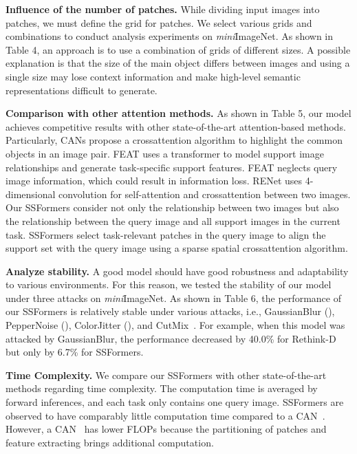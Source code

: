 \documentclass{SCIS2019}
\begin{document}
\textbf{Influence of the number of patches.}
While dividing input images into patches, we must define the grid for patches. We select various grids and combinations to conduct analysis experiments on \emph{mini}ImageNet. As shown in Table 4, an approach is to use a combination of grids of different sizes. A possible explanation is that the size of the main object differs between images and using a single size may lose context information and make high-level semantic representations difficult to generate. 

\textbf{Comparison with other attention methods.}
As shown in Table 5, our model achieves competitive results with other state-of-the-art attention-based methods. Particularly, CANs propose a crossattention algorithm to highlight the common objects in an image pair. FEAT uses a transformer to model support image relationships and generate task-specific support features. FEAT neglects query image information, which could result in information loss. RENet uses 4-dimensional convolution for self-attention and crossattention between two images. Our SSFormers consider not only the relationship between two images but also the relationship between the query image and all support images in the current task. SSFormers select task-relevant patches in the query image to align the support set with the query image using a sparse spatial crossattention algorithm.

\textbf{Analyze stability.}
A good model should have good robustness and adaptability to various environments. For this reason, we tested the stability of our model under three attacks on \emph{mini}ImageNet. As shown in Table 6, the performance of our SSFormers is relatively stable under various attacks, i.e., GaussianBlur (), PepperNoise (), ColorJitter (), and CutMix~\cite{45}. For example, when this model was attacked by GaussianBlur, the performance decreased by 40.0\% for Rethink-D~\cite{40} but only by 6.7\% for SSFormers.

\textbf{Time Complexity.} We compare our SSFormers with other state-of-the-art methods regarding time complexity. The computation time is averaged by  forward inferences, and each task only contains one query image. SSFormers are observed to have comparably little computation time compared to a CAN~\cite{14}. However, a CAN~\cite{14} has lower FLOPs because the partitioning of patches and feature extracting brings additional computation.
\end{document}
